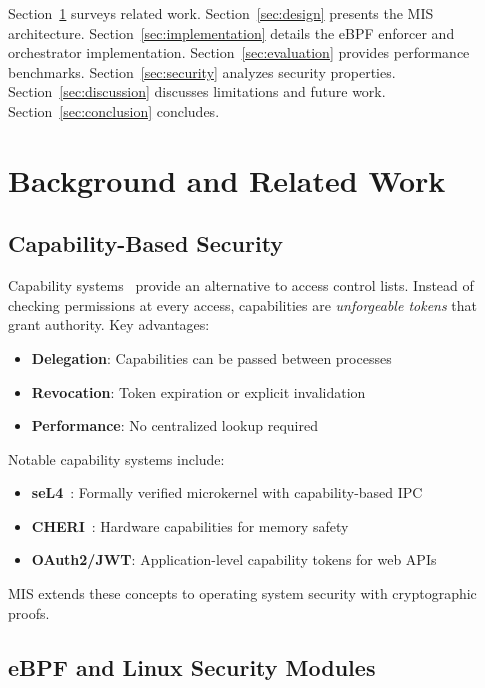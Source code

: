 \documentclass[11pt,a4paper]{article}
\begin{document}
Section~\ref{sec:background} surveys related work. Section~\ref{sec:design} presents the MIS architecture. Section~\ref{sec:implementation} details the eBPF enforcer and orchestrator implementation. Section~\ref{sec:evaluation} provides performance benchmarks. Section~\ref{sec:security} analyzes security properties. Section~\ref{sec:discussion} discusses limitations and future work. Section~\ref{sec:conclusion} concludes.

\section{Background and Related Work}
\label{sec:background}

\subsection{Capability-Based Security}

Capability systems~\cite{Dennis1966} provide an alternative to access control lists. Instead of checking permissions at every access, capabilities are \textit{unforgeable tokens} that grant authority. Key advantages:

\begin{itemize}
    \item \textbf{Delegation}: Capabilities can be passed between processes
    \item \textbf{Revocation}: Token expiration or explicit invalidation
    \item \textbf{Performance}: No centralized lookup required
\end{itemize}

Notable capability systems include:
\begin{itemize}
    \item \textbf{seL4}~\cite{Klein2009}: Formally verified microkernel with capability-based IPC
    \item \textbf{CHERI}~\cite{Watson2015}: Hardware capabilities for memory safety
    \item \textbf{OAuth2/JWT}: Application-level capability tokens for web APIs
\end{itemize}

MIS extends these concepts to operating system security with cryptographic proofs.

\subsection{eBPF and Linux Security Modules}
\end{document}
